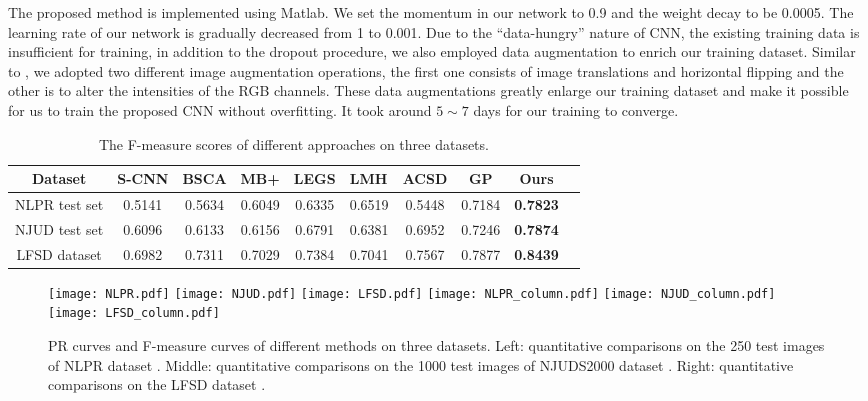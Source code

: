 \documentclass[journal]{IEEEtran}
\begin{document}
The proposed method is implemented using Matlab. We set the momentum in our network to 0.9 and the weight decay to be 0.0005. The learning rate of our network is gradually decreased from 1 to 0.001. Due to the ``data-hungry'' nature of CNN, the existing training data is insufficient for training, in addition to the dropout procedure, we also employed data augmentation to enrich our training dataset. Similar to \cite{krizhevsky2012imagenet}, we adopted two different image augmentation operations, the first one consists of image translations and horizontal flipping and the other is to alter the intensities of the RGB channels. These data augmentations greatly enlarge our training dataset and make it possible for us to train the proposed CNN without overfitting. It took around $5\sim7$ days for our training to converge.

\begin{table*}
\centering
\caption{The F-measure scores of different approaches on three datasets.}
\label{table:belta}
\begin{tabular}{|c||c|c|c|cIc|c|c|c|}
\hline
{Dataset} & S-CNN  & BSCA  &  MB+ & LEGS & LMH & ACSD & GP & Ours \\
\hline\hline
NLPR test set & 0.5141 & 0.5634 & 0.6049 & 0.6335 & 0.6519 & 0.5448 & 0.7184 & \textbf{0.7823}\\
NJUD test set & 0.6096 & 0.6133 & 0.6156 & 0.6791 & 0.6381 & 0.6952 &0.7246 & \textbf{0.7874} \\
LFSD dataset & 0.6982 & 	0.7311&	0.7029 & 0.7384&	0.7041&	0.7567&	0.7877&	\textbf{0.8439}\\
\hline
\end{tabular}
\end{table*}
\begin{figure*}
\vspace{-3mm}
\centering
\texttt{[image: NLPR.pdf]}
\texttt{[image: NJUD.pdf]}
\texttt{[image: LFSD.pdf]}
\texttt{[image: NLPR\_column.pdf]}
\texttt{[image: NJUD\_column.pdf]}
\texttt{[image: LFSD\_column.pdf]}
\caption{PR curves and F-measure curves of different methods on three datasets. Left: quantitative comparisons on the 250 test images of NLPR dataset \cite{peng2014rgbd}. Middle: quantitative comparisons on the 1000 test images of NJUDS2000 dataset \cite{ju2014depth}. Right: quantitative comparisons on the LFSD dataset \cite{Li_2014_CVPR}.}
\label{fig:saliency_qut}
\end{figure*}
\end{document}
